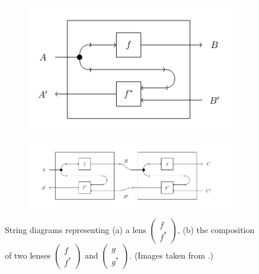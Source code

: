 \documentclass[11pt,a4paper,openright,twoside]{report}
\theoremstyle{plain}
\theoremstyle{definition}
\begin{document}
\begin{figure}[h]
  \begin{center}
    \begin{subfigure}{0.3\textwidth}
      \includegraphics[width=\textwidth]{figures/lens_inner_view.png}
      \caption{}
    \end{subfigure}
    \begin{subfigure}{0.6\textwidth}
      \includegraphics[width=\textwidth]{figures/lens_composition.png}
      \caption{}
    \end{subfigure}                 
    \caption[Lenses]{String diagrams representing (a) a lens $\left(\begin{smallmatrix} f \\ f^* \end{smallmatrix}\right)$, (b) the composition of two lenses $\left(\begin{smallmatrix} f \\ f^* \end{smallmatrix}\right)$ and $\left(\begin{smallmatrix} g \\ g^* \end{smallmatrix}\right)$. (Images taken from \cite{cruttwell2022categorical}.)}
    \label{fig: lenses}
  \end{center}
\end{figure}
\end{document}
